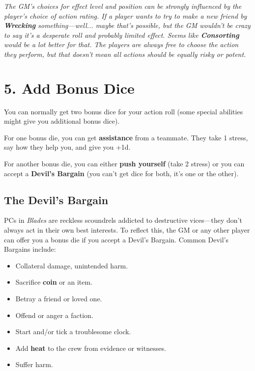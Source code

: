 \documentclass[11pt,oneside]{book}
\newcommand{\gameterm}[1]{\textbf{#1}}
\begin{document}
\emph{The GM’s choices for effect level and position can be strongly influenced by the player’s choice of action rating. If a player wants to try to make a new friend by \gameterm{Wrecking}  something---well... maybe that’s possible, but the GM wouldn’t be crazy to say it’s a desperate roll and probably limited effect. Seems like \gameterm{Consorting}  would be a lot better for that. The players are always free to choose the action they perform, but that doesn’t mean all actions should be equally risky or potent.}

\section{5. Add Bonus Dice}

You can normally get two bonus dice for your action roll (some special abilities might give you additional bonus dice).

For one bonus die, you can get \textbf{assistance} from a teammate. They take 1 stress, say how they help you, and give you +1d.

For another bonus die, you can either \textbf{push yourself} (take 2 stress) or you can accept a \textbf{Devil’s Bargain} (you can’t get dice for both, it’s one or the other).

\subsection{The Devil’s Bargain}

PCs in \emph{Blades} are reckless scoundrels addicted to destructive vices---they don’t always act in their own best interests. To reflect this, the GM or any other player can offer you a bonus die if you accept a Devil’s Bargain. Common Devil’s Bargains include:

\begin{itemize}
	\item Collateral damage, unintended harm.
	\item Sacrifice \gameterm{coin}  or an item.
	\item Betray a friend or loved one.
	\item Offend or anger a faction.
	\item Start and/or tick a troublesome clock.
	\item Add \gameterm{heat}  to the crew from evidence or witnesses.
	\item Suffer harm.
\end{itemize}
\end{document}
